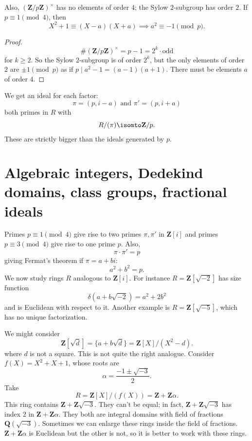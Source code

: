 \documentclass[11pt, oneside]{amsart}
\numberwithin{equation}{section}
\numberwithin{theorem}{section}
\theoremstyle{definition}
\def\Z{\mathbf{Z}}
\def\Q{\mathbf{Q}}
\begin{document}
{$$$$
Also, $(\Z/p\Z)^\times$ has no elements of order $4$; the Sylow $2$-subgroup has order $2$. If $p\equiv 1\pmod 4$, then 
$$
X^2 + 1 \equiv (X-a)(X+a)\implies a^2\equiv -1\pmod p.
$$
\begin{proof}
$$
\#(\Z/p\Z)^\times = p-1 = 2^{k}\cdot \mathrm{odd}
$$ 
for $k\geqslant 2$. So the Sylow $2$-subgroup is of order $2^k$, but the only elements of order $2$ are $\pm 1\pmod p$ as if $p\mid a^2-1 = (a-1)(a+1)$. There must be elements $a$ of order $4$. 
\end{proof}
We get an ideal for each factor:
$$
\pi = (p,i-a) \textrm{ and } \pi' = (p,i+a)
$$
both primes in $R$ with 
$$
R/(\pi) \isomto\Z/p.
$$ 
These are strictly bigger than the ideals generated by $p$.

\section{Algebraic integers, Dedekind domains, class groups, fractional ideals}
Primes $p \equiv 1\pmod 4$ give rise to two primes $\pi,\pi'$ in $\Z[i]$ and primes $p \equiv 3\pmod 4$ give rise to one prime $p$. Also, 
$$
\pi\cdot\pi' = p
$$
giving Fermat's theorem if $\pi = a+bi$:
$$
a^2+b^2 = p.
$$
We now study rings $R$ analogous to $\Z[i]$. For instance $R = \Z[\sqrt{-2}]$ has size function 
$$
\delta(a+b\sqrt{-2}) = a^2 + 2b^2
$$
and is Euclidean with respect to it. Another example is $R = \Z[\sqrt{-5}]$, which has no unique factorization.

We might consider 
$$ 
\Z[\sqrt{d}] =\{a+b\sqrt d\} = \Z[X]/(X^2-d).
$$
where $d$ is not a square. This is not quite the right analogue. Consider $f(X) = X^2+X+1$, whose roots are 
$$
\alpha = \frac{-1\pm\sqrt{-3}}{2}.
$$ 
Take 
$$
R=\Z[X]/(f(X))=\Z+\Z\alpha.
$$ 
This ring contains $\Z+\Z\sqrt{-3}$. They can't be equal; in fact, $\Z+\Z\sqrt{-3}$ has index $2$ in $\Z+\Z\alpha$. They both are integral domains with field of fractions $\Q(\sqrt{-3})$. Sometimes we can enlarge these rings inside the field of fractions. $\Z+\Z\alpha$ is Euclidean but the other is not, so it is better to work with these rings.

}
\end{document}
